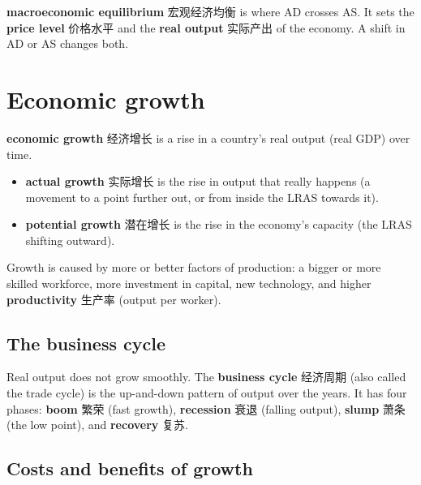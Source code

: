 \documentclass[11pt]{article}
\begin{document}
\textbf{macroeconomic equilibrium} 宏观经济均衡 is where AD crosses AS. It sets the \textbf{price level} 价格水平 and the \textbf{real output} 实际产出 of the economy. A shift in AD or AS changes both.

\section*{Economic growth}

\textbf{economic growth} 经济增长 is a rise in a country's real output (real GDP) over time.

\begin{itemize}
\item \textbf{actual growth} 实际增长 is the rise in output that really happens (a movement to a point further out, or from inside the LRAS towards it).

\item \textbf{potential growth} 潜在增长 is the rise in the economy's capacity (the LRAS shifting outward).

\end{itemize}

Growth is caused by more or better factors of production: a bigger or more skilled workforce, more investment in capital, new technology, and higher \textbf{productivity} 生产率 (output per worker).

\subsection*{The business cycle}

Real output does not grow smoothly. The \textbf{business cycle} 经济周期 (also called the trade cycle) is the up-and-down pattern of output over the years. It has four phases: \textbf{boom} 繁荣 (fast growth), \textbf{recession} 衰退 (falling output), \textbf{slump} 萧条 (the low point), and \textbf{recovery} 复苏.

\subsection*{Costs and benefits of growth}

\begin{center}
\end{center}
\end{document}
